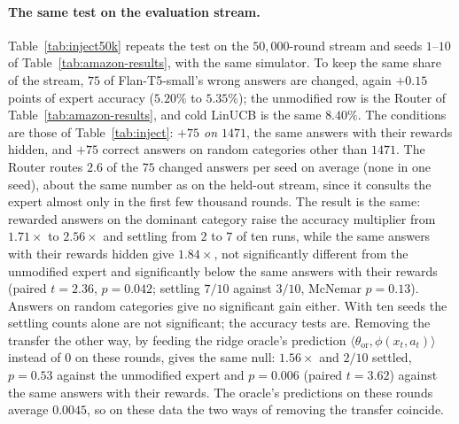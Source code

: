 \documentclass[anon]{alt2027} %
\begin{document}
\paragraph{The same test on the evaluation stream.}
Table~\ref{tab:inject50k} repeats the test on the $50{,}000$-round stream and
seeds $1$--$10$ of Table~\ref{tab:amazon-results}, with the same simulator.
To keep the same share of the stream, $75$ of Flan-T5-small's wrong answers
are changed, again $+0.15$ points of expert accuracy ($5.20\%$ to $5.35\%$);
the unmodified row is the Router of Table~\ref{tab:amazon-results}, and cold
LinUCB is the same $8.40\%$. The conditions are those of
Table~\ref{tab:inject}: \emph{$+75$ on $1471$}, the same answers with their
rewards hidden, and $+75$ correct answers on random categories other than
$1471$. The Router routes $2.6$ of the $75$ changed answers per seed on
average (none in one seed), about the same number as on the held-out stream,
since it consults the expert almost only in the first few thousand rounds.
The result is the same: rewarded answers on the dominant category raise the
accuracy multiplier from $1.71\times$ to $2.56\times$ and settling from $2$ to $7$ of
ten runs, while the same answers with their rewards hidden give $1.84\times$,
not significantly different from the unmodified expert and significantly
below the same answers with their rewards (paired $t=2.36$, $p=0.042$;
settling $7/10$ against $3/10$, McNemar $p=0.13$). Answers on random
categories give no significant gain either. With ten seeds the settling
counts alone are not significant; the accuracy tests are. Removing the
transfer the other way, by feeding the ridge oracle's prediction
$\langle\theta_{\mathrm{or}},\phi(x_t,a_t)\rangle$ instead of $0$ on these
rounds, gives the same null: $1.56\times$ and $2/10$ settled, $p=0.53$
against the unmodified expert and $p=0.006$ (paired $t=3.62$) against the same answers with
their rewards. The oracle's predictions on these rounds average $0.0045$,
so on these data the two ways of removing the transfer coincide.
\end{document}
